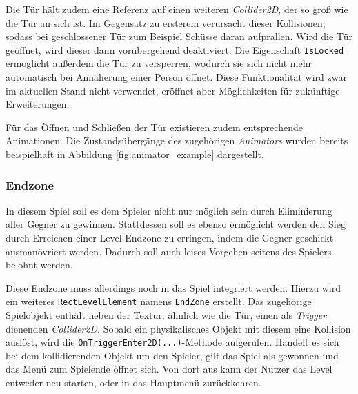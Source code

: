 Die Tür hält zudem eine Referenz auf einen weiteren \textit{Collider2D}, der so groß wie die Tür an sich ist. Im Gegensatz zu ersterem verursacht dieser Kollisionen, sodass bei geschlossener Tür zum Beispiel Schüsse daran aufprallen. Wird die Tür geöffnet, wird dieser dann vorübergehend deaktiviert. Die Eigenschaft \texttt{IsLocked} ermöglicht außerdem die Tür zu versperren, wodurch sie sich nicht mehr automatisch bei Annäherung einer Person öffnet. Diese Funktionalität wird zwar im aktuellen Stand nicht verwendet, eröffnet aber Möglichkeiten für zukünftige Erweiterungen.

Für das Öffnen und Schließen der Tür existieren zudem entsprechende Animationen. Die Zustandsübergänge des zugehörigen \textit{Animators} wurden bereits beispielhaft in Abbildung \ref{fig:animator_example} dargestellt.

\subsubsection{Endzone}\label{sec:endZone}
In diesem Spiel soll es dem Spieler nicht nur möglich sein durch Eliminierung aller Gegner zu gewinnen. Stattdessen soll es ebenso ermöglicht werden den Sieg durch Erreichen einer Level-Endzone zu erringen, indem die Gegner geschickt aus­ma­nö­v­rie­rt werden. Dadurch soll auch leises Vorgehen seitens des Spielers belohnt werden.

Diese Endzone muss allerdings noch in das Spiel integriert werden. Hierzu wird ein weiteres \texttt{RectLevelElement} namens \texttt{EndZone} erstellt. Das zugehörige Spielobjekt enthält neben der Textur, ähnlich wie die Tür, einen als \textit{Trigger} dienenden \textit{Collider2D}. Sobald ein physikalisches Objekt mit diesem eine Kollision auslöst, wird die \texttt{OnTriggerEnter2D(...)}-Methode aufgerufen. Handelt es sich bei dem kollidierenden Objekt um den Spieler, gilt das Spiel als gewonnen und das Menü zum Spielende öffnet sich. Von dort aus kann der Nutzer das Level entweder neu starten, oder in das Hauptmenü zurückkehren.